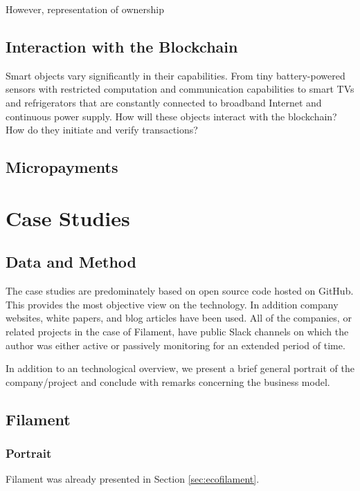 However, representation of ownership 

\subsection{Interaction with the Blockchain}

Smart objects vary significantly in their capabilities. From tiny battery-powered sensors with restricted computation and communication capabilities to smart TVs and refrigerators that are constantly connected to broadband Internet and continuous power supply. How will these objects interact with the blockchain? How do they initiate and verify transactions? 

\subsection{Micropayments}


\section{Case Studies}

\subsection{Data and Method}

The case studies are predominately based on open source code hosted on GitHub. This provides the most objective view on the technology. In addition company websites, white papers, and blog articles have been used. All of the companies, or related projects in the case of Filament, have public Slack channels on which the author was either active or passively monitoring for an extended period of time.

In addition to an technological overview, we present a brief general portrait of the company/project and conclude with remarks concerning the business model. 

\subsection{Filament}

\subsubsection{Portrait}

Filament was already presented in Section \ref{sec:ecofilament}. 

